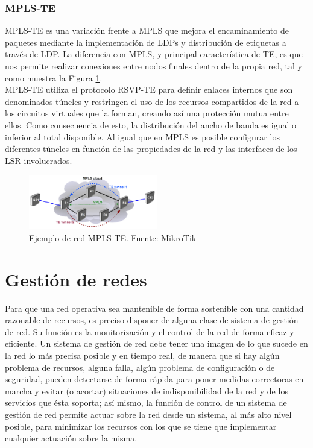 	 \subsubsection{MPLS-TE}
	 MPLS-TE es una variación frente a MPLS que mejora el encaminamiento de paquetes mediante la implementación de LDPs y distribución de etiquetas a través de LDP. La diferencia con MPLS, y principal característica de TE, es que nos permite realizar conexiones entre nodos finales dentro de la propia red, tal y como muestra la Figura \ref{mplste}.\\
	 MPLS-TE utiliza el protocolo RSVP-TE para definir enlaces internos que son denominados túneles y restringen el uso de los recursos compartidos de la red a los circuitos virtuales que la forman, creando así una protección mutua entre ellos. Como consecuencia de esto, la distribución del ancho de banda es igual o inferior al total disponible. Al igual que en MPLS es posible configurar los diferentes túneles en función de las propiedades de la red y las interfaces de los LSR involucrados.
	 
	 \begin{figure}[H]
			\centering
			\includegraphics[width=0.5\textwidth]{img/mplste.PNG}
			\caption{Ejemplo de red MPLS-TE. Fuente: MikroTik}
			\label{mplste}
		\end{figure}
		

	\section{Gestión de redes}
Para que una red operativa sea mantenible de forma sostenible con una cantidad razonable de recursos, es preciso disponer de alguna clase de sistema de gestión de red. Su función es la monitorización y el control de la red de forma eficaz y eficiente. Un sistema de gestión de red debe tener una imagen de lo que sucede en la red lo más precisa posible y en tiempo real, de manera que si hay algún problema de recursos, alguna falla, algún problema de configuración o de seguridad, pueden detectarse de forma rápida para poner medidas correctoras en marcha y evitar (o acortar) situaciones de indisponibilidad de la red y de los servicios que ésta soporta; así mismo, la función de control de un sistema de gestión de red permite actuar sobre la red desde un sistema, al más alto nivel posible, para minimizar los recursos con los que se tiene que implementar cualquier actuación sobre la misma. \\

